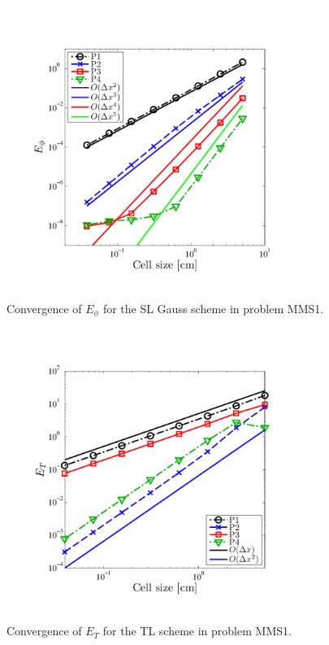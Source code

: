 %
%
\begin{figure}[!htp]
\centering
\includegraphics[width=10cm,trim=0.25in  0.5in 0.75in 0.75in,clip=true]{chapter6_grey_radtran/Dissertation_Data/MMS2_SLXS_Gauss_phi_L2.pdf}
\caption{Convergence of $E_{\phi}$ for the SL Gauss scheme in problem MMS1.}
\label{fig:mms1_gauss_phi}
\end{figure}
%
\begin{figure}[!hbp]
\centering
\includegraphics[width=10cm,trim=0.25in  0.5in 0.75in 0.75in,clip=true]{chapter6_grey_radtran/Dissertation_Data/MMS2_TL_temp_L2.pdf}
\caption{Convergence of $E_{T}$ for the TL scheme in problem MMS1.}
\label{fig:mms1_tl_temp}
\end{figure}
%
%
